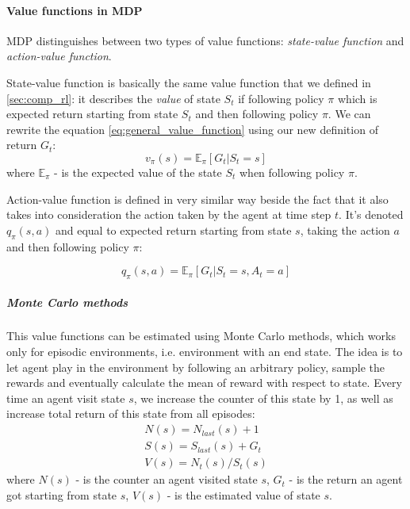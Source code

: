 \paragraph{Value functions in MDP} MDP distinguishes between two types of value functions:
\emph{state-value function} and \emph{action-value function}.

State-value function is basically the same value function that we defined in \autoref{sec:comp_rl}:
it describes the \emph{value} of state $S_t$ if following policy $\pi$ which is expected return
starting from state $S_t$ and then following policy $\pi$. We can rewrite the equation \ref{eq:general_value_function}
using our new definition of return $G_t$:
\begin{equation} \label{eq:value_state}
	v_{\pi}(s) = \mathbb{E}_{\pi} [G_t |S_t = s]
\end{equation}
where $\mathbb{E}_{\pi}$ - is the expected value of the state $S_t$ when
following policy $\pi$.

Action-value function is defined in very similar way beside the fact that it also takes
into consideration the action taken by the agent at time step $t$. It's denoted $q_{\pi}(s, a)$
and equal to expected return starting from state $s$, taking the action $a$ and then following
policy $\pi$:

\begin{equation} \label{eq:action_value_func}
	q_{\pi}(s, a) = \mathbb{E}_{\pi} [G_t |S_t = s, A_t = a]
\end{equation}

\subparagraph{Monte Carlo methods}

This value functions can be estimated using Monte Carlo methods, which works
only for episodic environments, i.e. environment with an end state.
The idea is to let agent play in the environment by following an arbitrary policy,
sample the rewards and eventually calculate the mean of reward with respect to state.
Every time an agent visit state $s$, we increase the counter
of this state by 1, as well as increase total return of this state from all episodes:
\begin{align}
	N(s) = N_{last}(s) + 1 \\
	S(s) = S_{last}(s) + G_t\\
	V(s) = N_t(s) / S_t(s)
\end{align}
where $N(s)$ - is the counter an agent visited state $s$,
$G_t$ - is the return an agent got starting from state $s$,
$V(s)$ - is the estimated value of state $s$.

